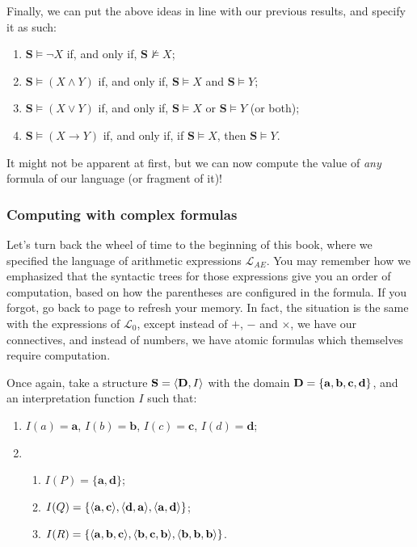 Finally, we can put the above ideas in line with our previous results, and specify it as such:

\begin{enumerate}
	\item $\mathbf{S} \models \neg X$ if, and only if, $\mathbf{S} \not\models X$;
	\item $\mathbf{S} \models (X \wedge Y)$ if, and only if, $\mathbf{S} \models X$ and $\mathbf{S}\models Y$;
	\item $\mathbf{S} \models (X \vee Y)$ if, and only if, $\mathbf{S} \models X$ or $\mathbf{S}\models Y$ (or both);
	\item $\mathbf{S} \models (X \rightarrow Y)$ if, and only if, if $\mathbf{S} \models X$, then $\mathbf{S} \models Y$. 
\end{enumerate}

It might not be apparent at first, but we can now compute the value of \textit{any} formula of our language (or fragment of it)!

\subsubsection{Computing with complex formulas}

Let's turn back the wheel of time to the beginning of this book, where we specified the language of arithmetic expressions $\mathcal{L}_{AE}$. You may remember how we emphasized that the syntactic trees for those expressions give you an order of computation, based on how the parentheses are configured in the formula. If you forgot, go back to page \pageref{syntrcom} to refresh your memory. In fact, the situation is the same with the expressions of $\mathcal{L}_0$, except instead of $+$, $-$ and $\times$, we have our connectives, and instead of numbers, we have atomic formulas which themselves require computation. 

Once again, take a structure $\mathbf{S}=\langle\mathbf{D}, I\rangle$ with the domain $\mathbf{D}=\{\mathbf{a}, \mathbf{b}, \mathbf{c}, \mathbf{d}\}$, and an interpretation function $I$ such that:

\begin{enumerate}
	\item $I(a)=\mathbf{a}$, $I(b)=\mathbf{b}$, $I(c)=\mathbf{c}$, $I(d)=\mathbf{d}$; 
	\item 
	\begin{enumerate}
		\item $I(P)=\{\mathbf{a}, \mathbf{d}\}$;
		\item $I(Q)=\{\langle\mathbf{a}, \mathbf{c}\rangle, \langle\mathbf{d}, \mathbf{a}\rangle, \langle\mathbf{a}, \mathbf{d}\rangle\}$;
		\item $I(R)=\{\langle\mathbf{a}, \mathbf{b}, \mathbf{c}\rangle, \langle\mathbf{b}, \mathbf{c}, \mathbf{b}\rangle, \langle\mathbf{b}, \mathbf{b}, \mathbf{b}\rangle\}$.
	\end{enumerate} 
\end{enumerate}

